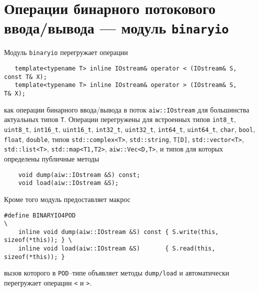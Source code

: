 \section{Операции бинарного потокового ввода/вывода --- модуль {\tt binaryio}}\label{binaryio:sec}
Модуль \verb'binaryio' перегружает операции
\begin{verbatim}
   template<typename T> inline IOstream& operator < (IOstream& S, const T& X);
   template<typename T> inline IOstream& operator > (IOstream& S,       T& X);
\end{verbatim}
как операции бинарного ввода/вывода в поток \verb'aiw::IOstream' для большинства актуальных типов \verb'T'.
Операции перегружены для встроенных типов \verb'int8_t', \verb'uint8_t', \verb'int16_t', \verb'uint16_t', \verb'int32_t', \verb'uint32_t', \verb'int64_t', \verb'uint64_t',
\verb'char', \verb'bool', \verb'float', \verb'double', типов \verb'std::complex<T>', \verb'std::string',
\verb'T[D]', \verb'std::vector<T>', \verb'std::list<T>', \verb'std::map<T1,T2>', \verb'aiw::Vec<D,T>',
и типов для которых определены публичные методы
\begin{verbatim}
    void dump(aiw::IOstream &S) const;
    void load(aiw::IOstream &S);
\end{verbatim}
Кроме того модуль предоставляет макрос
\begin{verbatim}
#define BINARYIO4POD                                                           \
    inline void dump(aiw::IOstream &S) const { S.write(this, sizeof(*this)); } \
    inline void load(aiw::IOstream &S)       { S.read(this, sizeof(*this)); }  
\end{verbatim}
вызов которого в \verb'POD'--типе объявляет методы \verb'dump/load' и автоматически перегружает операции \verb'<' и \verb'>'.
